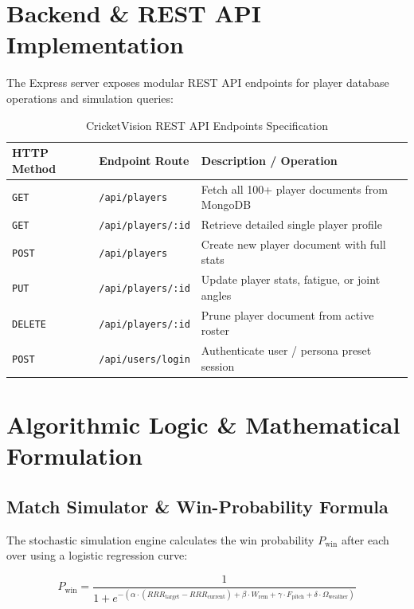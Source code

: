 \documentclass[12pt,a4paper]{report}
\begin{document}
\section{Backend \& REST API Implementation}
The Express server exposes modular REST API endpoints for player database operations and simulation queries:

\begin{table}[H]
\centering
\caption{CricketVision REST API Endpoints Specification}
\label{tab:api_endpoints}
\begin{tabular}{lll}
\toprule
\textbf{HTTP Method} & \textbf{Endpoint Route} & \textbf{Description / Operation} \\
\midrule
\texttt{GET} & \texttt{/api/players} & Fetch all 100+ player documents from MongoDB \\
\texttt{GET} & \texttt{/api/players/:id} & Retrieve detailed single player profile \\
\texttt{POST} & \texttt{/api/players} & Create new player document with full stats \\
\texttt{PUT} & \texttt{/api/players/:id} & Update player stats, fatigue, or joint angles \\
\texttt{DELETE} & \texttt{/api/players/:id} & Prune player document from active roster \\
\texttt{POST} & \texttt{/api/users/login} & Authenticate user / persona preset session \\
\bottomrule
\end{tabular}
\end{table}

\section{Algorithmic Logic \& Mathematical Formulation}

\subsection{Match Simulator \& Win-Probability Formula}
The stochastic simulation engine calculates the win probability $P_{\text{win}}$ after each over using a logistic regression curve:

\begin{equation}
P_{\text{win}} = \frac{1}{1 + e^{-\left( \alpha \cdot (RRR_{\text{target}} - RRR_{\text{current}}) + \beta \cdot W_{\text{rem}} + \gamma \cdot F_{\text{pitch}} + \delta \cdot \Omega_{\text{weather}} \right)}}
\end{equation}
\end{document}
